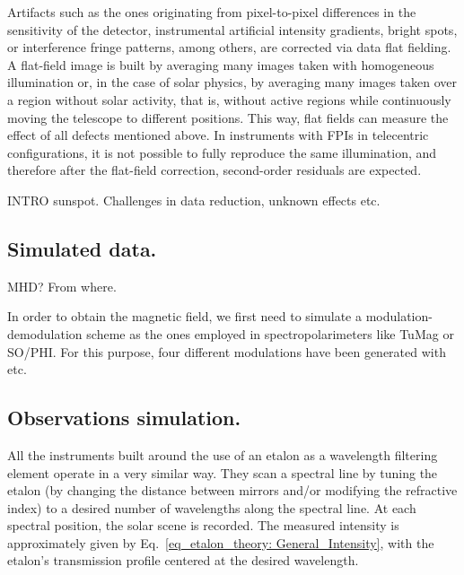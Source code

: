 Artifacts such as the ones originating from pixel-to-pixel differences in the sensitivity of the detector, instrumental artificial intensity gradients, bright spots, or interference fringe patterns, among others, are corrected via data flat fielding. A flat-field image is built by averaging many images taken with homogeneous illumination or, in the case of solar physics, by averaging many images taken over a region without solar activity, that is, without active regions while continuously moving the telescope to different positions. This way, flat fields can measure the effect of all defects mentioned above. In instruments with FPIs in telecentric configurations, it is not possible to fully reproduce the same illumination, and therefore after the flat-field correction, second-order residuals are expected.



INTRO sunspot. Challenges in data reduction, unknown effects etc. 

\subsection{Simulated data.}





MHD? From where.  


In order to obtain the magnetic field, we first need to simulate a modulation-demodulation scheme as the ones employed in spectropolarimeters like TuMag or SO/PHI. For this purpose, four different modulations have been generated with etc. 

\subsection{Observations simulation.}

All the instruments built around the use of an etalon as a wavelength filtering element operate in a very similar way. They scan a spectral line by tuning the etalon (by changing the distance between mirrors and/or modifying the refractive index) to a desired number of wavelengths along the spectral line. At each spectral position, the solar scene is recorded. The measured intensity is approximately given by Eq.~\eqref{eq_etalon_theory: General_Intensity}, with the etalon's transmission profile centered at the desired wavelength.

